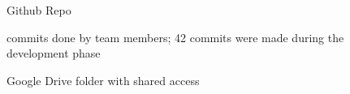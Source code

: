 \begin{figure}[H]
    \centering
    \caption{Github Repo}
    \label{fig:ghr}
\end{figure}
\begin{figure}[H]
    \centering
    \caption{commits done by team members; 42 commits were made during the development phase}
    \label{fig:ghr2}
\end{figure}
\begin{figure}[H]
    \centering
    \caption{Google Drive folder with shared access}
    \label{fig:ghr3}
\end{figure}

